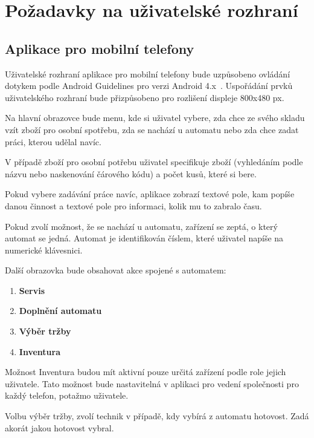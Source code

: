 \documentclass[a4paper,10pt]{article}
\begin{document}
\section{Požadavky na uživatelské rozhraní}
\subsection{Aplikace pro mobilní telefony}
Uživatelské rozhraní aplikace pro mobilní telefony bude uzpůsobeno ovládání dotykem podle Android Guidelines pro verzi Android 4.x~\cite{android_guidelines}. Uspořádání prvků uživatelského rozhraní bude přizpůsobeno pro rozlišení displeje 800x480 px.

Na hlavní obrazovce bude menu, kde si uživatel vybere, zda chce ze svého skladu vzít zboží pro osobní spotřebu, zda se nachází u automatu nebo zda chce zadat práci, kterou udělal navíc.

V případě zboží pro osobní potřebu uživatel specifikuje zboží (vyhledáním podle názvu nebo naskenování čárového kódu) a počet kusů, které si bere.

Pokud vybere zadávání práce navíc, aplikace zobrazí textové pole, kam popíše danou činnost a textové pole pro informaci, kolik mu to zabralo času.

Pokud zvolí možnost, že se nachází u automatu, zařízení se zeptá, o který automat se jedná. Automat je identifikován číslem, které uživatel napíše na numerické klávesnici.

Další obrazovka bude obsahovat akce spojené s automatem:

\begin{enumerate}
	\item \textbf{Servis}
	\item \textbf{Doplnění automatu}
	\item \textbf{Výběr tržby}
	\item \textbf{Inventura}
\end{enumerate}

Možnost Inventura budou mít aktivní pouze určitá zařízení podle role jejich uživatele. Tato možnost bude nastavitelná v aplikaci pro vedení společnosti pro každý telefon, potažmo uživatele.

Volbu výběr tržby, zvolí technik v případě, kdy vybírá z automatu hotovost. Zadá akorát jakou hotovost vybral.
\end{document}
